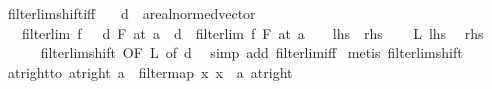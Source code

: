 \begin{isabellebody}
\isamarkupfalse%
%
\endisatagproof
{\isafoldproof}%
%
\isadelimproof
\isanewline
%
\endisadelimproof
\isanewline
{}\isamarkupfalse%
\ filterlim{\isacharunderscore}{\kern0pt}shift{\isacharunderscore}{\kern0pt}iff{\isacharcolon}{\kern0pt}\isanewline
\ \ \ d\ {\isacharcolon}{\kern0pt}{\isacharcolon}{\kern0pt}\ {\isachardoublequoteopen}{\isacharprime}{\kern0pt}a{\isacharcolon}{\kern0pt}{\isacharcolon}{\kern0pt}real{\isacharunderscore}{\kern0pt}normed{\isacharunderscore}{\kern0pt}vector{\isachardoublequoteclose}\isanewline
\ \ \ {\isachardoublequoteopen}filterlim\ {\isacharparenleft}{\kern0pt}f\ {\isasymcirc}\ {\isacharparenleft}{\kern0pt}{\isacharplus}{\kern0pt}{\isacharparenright}{\kern0pt}\ d{\isacharparenright}{\kern0pt}\ F\ {\isacharparenleft}{\kern0pt}at\ {\isacharparenleft}{\kern0pt}a\ {\isacharminus}{\kern0pt}\ d{\isacharparenright}{\kern0pt}{\isacharparenright}{\kern0pt}\ {\isacharequal}{\kern0pt}\ filterlim\ f\ F\ {\isacharparenleft}{\kern0pt}at\ a{\isacharparenright}{\kern0pt}{\isachardoublequoteclose}\ \ \ {\isacharparenleft}{\kern0pt}\ {\isachardoublequoteopen}{\isacharquery}{\kern0pt}lhs\ {\isacharequal}{\kern0pt}\ {\isacharquery}{\kern0pt}rhs{\isachardoublequoteclose}{\isacharparenright}{\kern0pt}\isanewline
%
\isadelimproof
%
\endisadelimproof
%
\isatagproof
{}\isamarkupfalse%
\isanewline
\ \ \isamarkupfalse%
\ L{\isacharcolon}{\kern0pt}\ {\isacharquery}{\kern0pt}lhs\ \isamarkupfalse%
\ {\isacharquery}{\kern0pt}rhs\isanewline
\ \ \ \ \isamarkupfalse%
\ filterlim{\isacharunderscore}{\kern0pt}shift\ {\isacharbrackleft}{\kern0pt}OF\ L{\isacharcomma}{\kern0pt}\ of\ {\isachardoublequoteopen}{\isacharminus}{\kern0pt}d{\isachardoublequoteclose}{\isacharbrackright}{\kern0pt}\ \isamarkupfalse%
\ {\isacharparenleft}{\kern0pt}simp\ add{\isacharcolon}{\kern0pt}\ filterlim{\isacharunderscore}{\kern0pt}iff{\isacharparenright}{\kern0pt}\isanewline
{}\isamarkupfalse%
\ {\isacharparenleft}{\kern0pt}metis\ filterlim{\isacharunderscore}{\kern0pt}shift{\isacharparenright}{\kern0pt}%
\endisatagproof
{\isafoldproof}%
%
\isadelimproof
\isanewline
%
\endisadelimproof
\isanewline
{}\isamarkupfalse%
\ at{\isacharunderscore}{\kern0pt}right{\isacharunderscore}{\kern0pt}to{\isacharunderscore}{\kern0pt}{}{\isacharcolon}{\kern0pt}\ {\isachardoublequoteopen}at{\isacharunderscore}{\kern0pt}right\ a\ {\isacharequal}{\kern0pt}\ filtermap\ {\isacharparenleft}{\kern0pt}{\isasymlambda}x{\isachardot}{\kern0pt}\ x\ {\isacharplus}{\kern0pt}\ a{\isacharparenright}{\kern0pt}\ {\isacharparenleft}{\kern0pt}at{\isacharunderscore}{\kern0pt}right\ {}{\isacharparenright}{\kern0pt}{\isachardoublequoteclose}\isanewline

\end{isabellebody}

